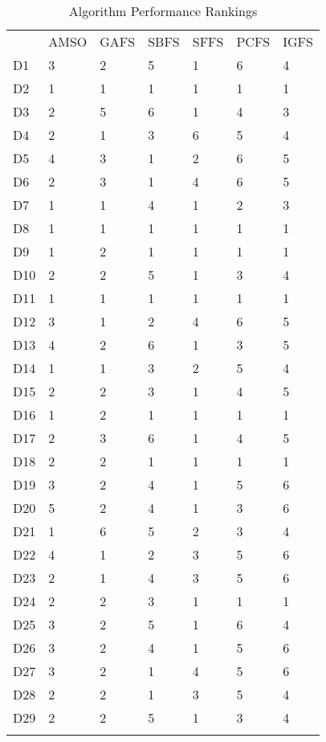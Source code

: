 \begin{table}
\caption{Algorithm Performance Rankings}
\label{tbl:algorithm:rank}
\begin{tabular}{lllllll}
\noalign{\smallskip}\hline\noalign{\smallskip}
&AMSO&GAFS&SBFS&SFFS&PCFS&IGFS\\
\noalign{\smallskip}\hline
D1&3&2&5&1&6&4\\
D2&1&1&1&1&1&1\\
D3&2&5&6&1&4&3\\
D4&2&1&3&6&5&4\\
D5&4&3&1&2&6&5\\
D6&2&3&1&4&6&5\\
D7&1&1&4&1&2&3\\
D8&1&1&1&1&1&1\\
D9&1&2&1&1&1&1\\
D10&2&2&5&1&3&4\\
D11&1&1&1&1&1&1\\
D12&3&1&2&4&6&5\\
D13&4&2&6&1&3&5\\
D14&1&1&3&2&5&4\\
D15&2&2&3&1&4&5\\
D16&1&2&1&1&1&1\\
D17&2&3&6&1&4&5\\
D18&2&2&1&1&1&1\\
D19&3&2&4&1&5&6\\
D20&5&2&4&1&3&6\\
D21&1&6&5&2&3&4\\
D22&4&1&2&3&5&6\\
D23&2&1&4&3&5&6\\
D24&2&2&3&1&1&1\\
D25&3&2&5&1&6&4\\
D26&3&2&4&1&5&6\\
D27&3&2&1&4&5&6\\
D28&2&2&1&3&5&4\\
D29&2&2&5&1&3&4\\
\noalign{\smallskip}\hline
\end{tabular}
\end{table}
